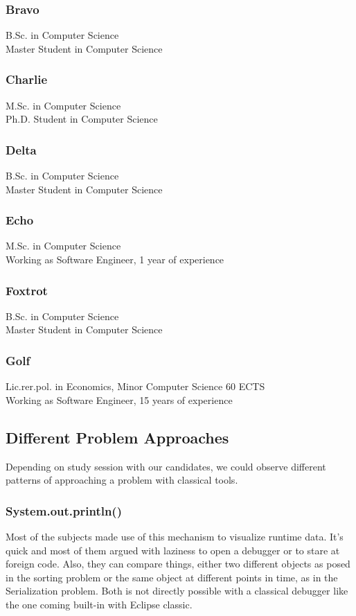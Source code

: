 \documentclass{report}
\begin{document}
\subsubsection*{Bravo} %
B.Sc. in Computer Science\\
Master Student  in Computer Science
\subsubsection*{Charlie} %
M.Sc. in Computer Science\\ %
Ph.D. Student in Computer Science
\subsubsection*{Delta} %
B.Sc. in Computer Science\\
Master Student  in Computer Science
\subsubsection*{Echo} %
M.Sc. in Computer Science\\
Working as Software Engineer, 1 year of experience
\subsubsection*{Foxtrot} %
B.Sc. in Computer Science\\
Master Student  in Computer Science
\subsubsection*{Golf} %
Lic.rer.pol. in Economics, Minor Computer Science 60 ECTS\\
Working as Software Engineer, 15 years of experience

\subsection*{Different Problem Approaches}
Depending on study session with our candidates, we could observe different patterns of approaching a problem with classical tools.
\subsubsection*{System.out.println()}
Most of the subjects made use of this mechanism to visualize runtime data. It's quick and most of them argued with laziness to open a debugger or to stare at foreign code. Also, they can compare things, either two different objects as posed in the sorting problem or the same object at different points in time, as in the Serialization problem. Both is not directly possible with a classical debugger like the one coming built-in with Eclipse classic.
\end{document}

